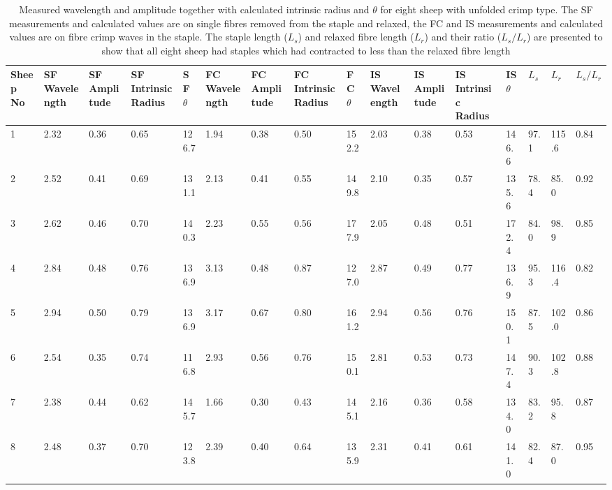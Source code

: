 \begin{landscape}
\begin{table}[ht]
\centering
\caption{Measured wavelength and amplitude together with calculated intrinsic radius and $\theta$ for eight sheep with unfolded crimp type. The SF measurements and calculated values are on single fibres removed from the staple and relaxed, the FC and IS measurements and calculated values are on fibre crimp waves in the staple. The staple length ($L_{s}$) and relaxed fibre length ($L_{r}$)  and their ratio ($L_{s}/L_{r}$) are presented to show that all eight sheep had staples which had contracted to less than the relaxed fibre length}
\label{tab:concertina}
\begin{tabular}{p{0.3in}|p{0.3in}|p{0.3in}|p{0.3in}|p{0.3in}|p{0.3in}|p{0.3in}|p{0.3in}|p{0.3in}|p{0.3in}|p{0.3in}|p{0.3in}|p{0.3in}|p{0.3in}|p{0.3in}|p{0.3in}}
  \hline
  Sheep No & SF Wavelength & SF Amplitude & SF Intrinsic Radius & SF $\theta$ & FC Wavelength & FC Amplitude & FC Intrinsic Radius & FC $\theta$ & IS Wavelength & IS Amplitude & IS Intrinsic Radius & IS $\theta$ & $L_{s}$ & $L_{r}$ & $L_{s}/L_{r}$ \\ 
  \hline
  1  & 2.32 & 0.36 & 0.65 & 126.7 & 1.94 & 0.38 & 0.50 & 152.2 & 2.03 & 0.38 & 0.53 & 146.6 & 97.1 & 115.6 & 0.84 \\ 
  2  & 2.52 & 0.41 & 0.69 & 131.1 & 2.13 & 0.41 & 0.55 & 149.8 & 2.10 & 0.35 & 0.57 & 135.6 & 78.4 & 85.0 & 0.92 \\ 
  3  & 2.62 & 0.46 & 0.70 & 140.3 & 2.23 & 0.55 & 0.56 & 177.9 & 2.05 & 0.48 & 0.51 & 172.4 & 84.0 & 98.9 & 0.85 \\ 
  4  & 2.84 & 0.48 & 0.76 & 136.9 & 3.13 & 0.48 & 0.87 & 127.0 & 2.87 & 0.49 & 0.77 & 136.9 & 95.3 & 116.4 & 0.82 \\ 
  5  & 2.94 & 0.50 & 0.79 & 136.9 & 3.17 & 0.67 & 0.80 & 161.2 & 2.94 & 0.56 & 0.76 & 150.1 & 87.5 & 102.0 & 0.86 \\ 
  6  & 2.54 & 0.35 & 0.74 & 116.8 & 2.93 & 0.56 & 0.76 & 150.1 & 2.81 & 0.53 & 0.73 & 147.4 & 90.3 & 102.8 & 0.88 \\ 
  7  & 2.38 & 0.44 & 0.62 & 145.7 & 1.66 & 0.30 & 0.43 & 145.1 & 2.16 & 0.36 & 0.58 & 134.0 & 83.2 & 95.8 & 0.87 \\ 
  8  & 2.48 & 0.37 & 0.70 & 123.8 & 2.39 & 0.40 & 0.64 & 135.9 & 2.31 & 0.41 & 0.61 & 141.0 & 82.4 & 87.0 & 0.95 \\ 
   \hline
\end{tabular}
\end{table}
\end{landscape}
